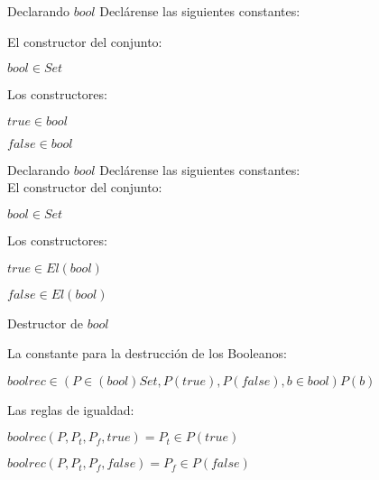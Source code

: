 \documentclass{beamer}
\begin{document}
\begin{frame}{Declarando $bool$}
  Decl\'arense las siguientes constantes:\\

  \pause

  El constructor del conjunto:
  
  \pause
  \begin{center}
    $bool \in Set$
  \end{center}
  \pause
  
  Los constructores:
  
  \pause

  \begin{center}
    
    $true \in bool$

    $false \in bool$
    
  \end{center}
  
 
\end{frame}

\begin{frame}{Declarando $bool$}
  Decl\'arense las siguientes constantes:\\

  El constructor del conjunto:
  
 
  \begin{center}
    $bool \in Set$
  \end{center}
  
  Los constructores:
  
  
  \begin{center}
    
    $true \in El(bool)$

    $false \in El(bool)$
    
  \end{center}
  

\end{frame}


\begin{frame}{Destructor de $bool$}
  \pause
  
  La constante para la destrucci\'on de los Booleanos:

  \pause
  
  \begin{center}
    $boolrec \in (P \in (bool)Set, P(true),P(false), b \in bool) P(b)$
  \end{center}

  \pause
  Las reglas de igualdad:

  \begin{center}
    $boolrec(P,P_t,P_f,true) = P_t \in P(true)$
    
    $boolrec(P,P_t,P_f,false) = P_f \in P(false)$
  \end{center}
  

\end{frame}
\end{document}
